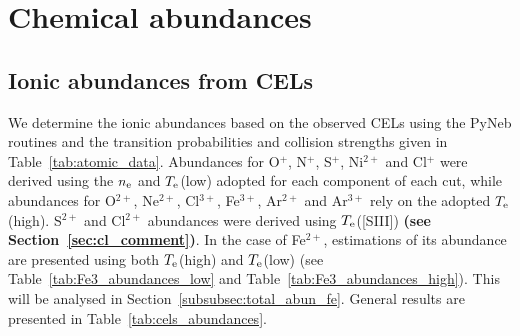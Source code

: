 \documentclass[fleqn,usenatbib]{mnras}
\begin{document}
\section{Chemical abundances}
\label{sec:chemical_abundances}

\subsection{Ionic abundances from CELs}
\label{subsec:ionic_from_CELS}

 We determine the ionic abundances based on the observed CELs using the PyNeb routines and the transition probabilities and collision strengths given in Table~\ref{tab:atomic_data}. Abundances for O$^{+}$, N$^{+}$, S$^{+}$, Ni$^{2+}$ and Cl$^{+}$ were derived using the $n_{\rm e}$ and $T_{\rm e}$(low) adopted for each component of each cut, while abundances for O$^{2+}$, Ne$^{2+}$, Cl$^{3+}$, Fe$^{3+}$, Ar$^{2+}$ and Ar$^{3+}$ rely on the adopted $T_{\rm e}$(high). S$^{2+}$ and Cl$^{2+}$ abundances were derived using $T_{\rm e}$([S\thinspace III]) {\bf (see Section~\ref{sec:cl_comment})}. In the case of Fe$^{2+}$, estimations of its abundance are presented using both $T_{\rm e}$(high) and $T_{\rm e}$(low) (see Table~\ref{tab:Fe3_abundances_low} and Table~\ref{tab:Fe3_abundances_high}). This will be analysed in Section~\ref{subsubsec:total_abun_fe}. General results are presented in Table~\ref{tab:cels_abundances}.
\end{document}
